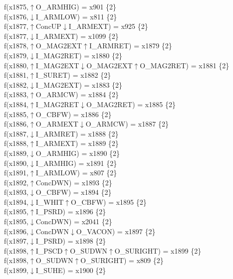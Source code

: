 f(x1875,$\uparrow$O\_ARMHIG) = x901 \{2\} \\  
f(x1876,$\downarrow$I\_ARMLOW) = x811 \{2\} \\  
f(x1877,$\uparrow$ConcUP$\downarrow$I\_ARMEXT) = x925 \{2\} \\  
f(x1877,$\downarrow$I\_ARMEXT) = x1099 \{2\} \\  
f(x1878,$\uparrow$O\_MAG2EXT$\uparrow$I\_ARMRET) = x1879 \{2\} \\  
f(x1879,$\downarrow$I\_MAG2RET) = x1880 \{2\} \\  
f(x1880,$\uparrow$I\_MAG2EXT$\downarrow$O\_MAG2EXT$\uparrow$O\_MAG2RET) = x1881 \{2\} \\  
f(x1881,$\uparrow$I\_SURET) = x1882 \{2\} \\  
f(x1882,$\downarrow$I\_MAG2EXT) = x1883 \{2\} \\  
f(x1883,$\uparrow$O\_ARMCW) = x1884 \{2\} \\  
f(x1884,$\uparrow$I\_MAG2RET$\downarrow$O\_MAG2RET) = x1885 \{2\} \\  
f(x1885,$\uparrow$O\_CBFW) = x1886 \{2\} \\  
f(x1886,$\uparrow$O\_ARMEXT$\downarrow$O\_ARMCW) = x1887 \{2\} \\  
f(x1887,$\downarrow$I\_ARMRET) = x1888 \{2\} \\  
f(x1888,$\uparrow$I\_ARMEXT) = x1889 \{2\} \\  
f(x1889,$\downarrow$O\_ARMHIG) = x1890 \{2\} \\  
f(x1890,$\downarrow$I\_ARMHIG) = x1891 \{2\} \\  
f(x1891,$\uparrow$I\_ARMLOW) = x807 \{2\} \\  
f(x1892,$\uparrow$ConcDWN) = x1893 \{2\} \\  
f(x1893,$\downarrow$O\_CBFW) = x1894 \{2\} \\  
f(x1894,$\downarrow$I\_WHIT$\uparrow$O\_CBFW) = x1895 \{2\} \\  
f(x1895,$\uparrow$I\_PSRD) = x1896 \{2\} \\  
f(x1895,$\downarrow$ConcDWN) = x2041 \{2\} \\  
f(x1896,$\downarrow$ConcDWN$\downarrow$O\_VACON) = x1897 \{2\} \\  
f(x1897,$\downarrow$I\_PSRD) = x1898 \{2\} \\  
f(x1898,$\uparrow$I\_PSCD$\uparrow$O\_SUDWN$\uparrow$O\_SURIGHT) = x1899 \{2\} \\  
f(x1898,$\uparrow$O\_SUDWN$\uparrow$O\_SURIGHT) = x809 \{2\} \\  
f(x1899,$\downarrow$I\_SUHE) = x1900 \{2\} \\  
